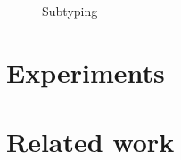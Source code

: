 \documentclass[sigplan,screen,review]{acmart}
\begin{document}
\begin{figure*}[h]
\begin{mathpar}











\end{mathpar}
\caption{Subtyping}
\label{fig:subtyping}
\end{figure*}





\section{Experiments}


\section{Related work}

\end{document}
